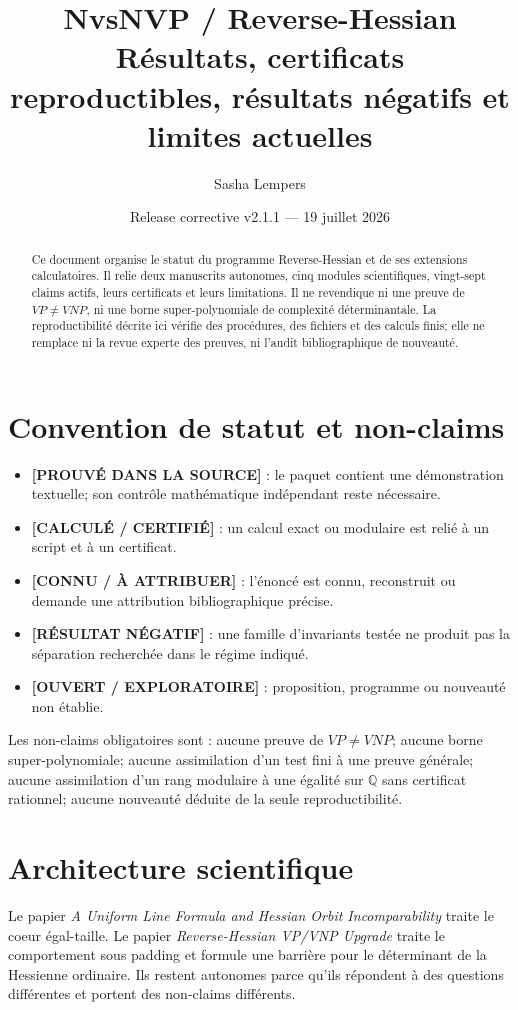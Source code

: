 \documentclass[10pt]{article}
\title{NvsNVP / Reverse-Hessian\\Résultats, certificats reproductibles, résultats négatifs et limites actuelles}
\author{Sasha Lempers}
\date{Release corrective v2.1.1 --- 19 juillet 2026}
\newcommand{\proved}{\textcolor{proved}{\textbf{[PROUVÉ DANS LA SOURCE]}}}
\newcommand{\computed}{\textcolor{computed}{\textbf{[CALCULÉ / CERTIFIÉ]}}}
\newcommand{\known}{\textcolor{known}{\textbf{[CONNU / À ATTRIBUER]}}}
\newcommand{\negative}{\textcolor{negative}{\textbf{[RÉSULTAT NÉGATIF]}}}
\newcommand{\openstatus}{\textcolor{open}{\textbf{[OUVERT / EXPLORATOIRE]}}}
\begin{document}
\maketitle

\begin{abstract}
Ce document organise le statut du programme Reverse-Hessian et de ses extensions calculatoires. Il relie deux manuscrits autonomes, cinq modules scientifiques, vingt-sept claims actifs, leurs certificats et leurs limitations. Il ne revendique ni une preuve de $VP\neq VNP$, ni une borne super-polynomiale de complexité déterminantale. La reproductibilité décrite ici vérifie des procédures, des fichiers et des calculs finis; elle ne remplace ni la revue experte des preuves, ni l'audit bibliographique de nouveauté.
\end{abstract}

\section{Convention de statut et non-claims}
\begin{itemize}[leftmargin=*]
  \item \proved{} : le paquet contient une démonstration textuelle; son contrôle mathématique indépendant reste nécessaire.
  \item \computed{} : un calcul exact ou modulaire est relié à un script et à un certificat.
  \item \known{} : l'énoncé est connu, reconstruit ou demande une attribution bibliographique précise.
  \item \negative{} : une famille d'invariants testée ne produit pas la séparation recherchée dans le régime indiqué.
  \item \openstatus{} : proposition, programme ou nouveauté non établie.
\end{itemize}

Les non-claims obligatoires sont : aucune preuve de $VP\neq VNP$; aucune borne super-polynomiale; aucune assimilation d'un test fini à une preuve générale; aucune assimilation d'un rang modulaire à une égalité sur $\mathbb{Q}$ sans certificat rationnel; aucune nouveauté déduite de la seule reproductibilité.

\section{Architecture scientifique}
Le papier \emph{A Uniform Line Formula and Hessian Orbit Incomparability} traite le coeur égal-taille. Le papier \emph{Reverse-Hessian VP/VNP Upgrade} traite le comportement sous padding et formule une barrière pour le déterminant de la Hessienne ordinaire. Ils restent autonomes parce qu'ils répondent à des questions différentes et portent des non-claims différents.
\end{document}
